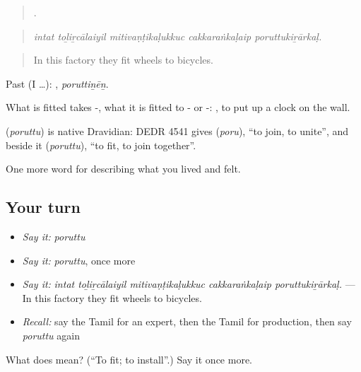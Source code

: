 \begin{quote}
    .
\end{quote}

\begin{quote}
\emph{intat toḻiṟcālaiyil mitivaṇṭikaḷukkuc cakkaraṅkaḷaip poruttukiṟārkaḷ.}
\end{quote}

\begin{quote}
In this factory they fit wheels to bicycles.
\end{quote}

Past (I …): , \emph{poruttiṉēṉ}.

What is fitted takes -, what it is fitted to - or -:   , to put up a clock on the wall.

\begin{cousinweb}
\textbf{} (\emph{poruttu}) is native Dravidian: DEDR 4541 gives  (\emph{poru}), \textquotedblleft{}to join, to unite\textquotedblright{}, and beside it  (\emph{poruttu}), \textquotedblleft{}to fit, to join together\textquotedblright{}.
\end{cousinweb}

\begin{grammarlens}[title={What you've built}]
One more word for describing what you lived and felt.
\end{grammarlens}

\subsection*{Your turn}
\begin{itemize}
\raggedright
  \item \emph{Say it:} \emph{poruttu}
  \item \emph{Say it:} \emph{poruttu}, once more
  \item \emph{Say it:} \emph{intat toḻiṟcālaiyil mitivaṇṭikaḷukkuc cakkaraṅkaḷaip poruttukiṟārkaḷ.} — In this factory they fit wheels to bicycles.
  \item \emph{Recall:} say the Tamil for an expert, then the Tamil for production, then say \emph{poruttu} again
\end{itemize}

\begin{tcolorbox}[breakable,colback=teal!4,colframe=teal!35!black,title={Before you move on}]
What does  mean? (\textquotedblleft{}To fit; to install\textquotedblright{}.) Say it once more.
\end{tcolorbox}
